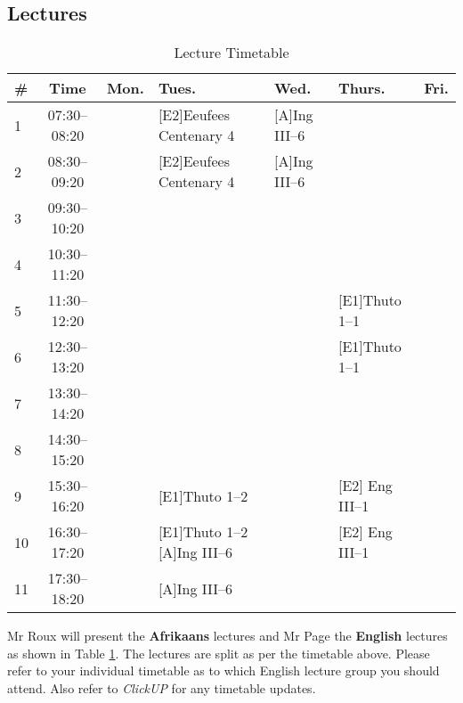     \subsection{Lectures}
        \begin{table}[!h]
            \begin{center}
             \begin{tabular}{|l|c|p{1.4cm}|p{2.6cm}|p{2.1cm}|p{2.6cm}|p{1.4cm}|}
                 \hline
                 {\bf \#} & {\bf Time} & {\bf Mon.} & {\bf Tues.} & {\bf Wed.} &
                 {\bf Thurs.} & {\bf Fri.} \\
                 \hline
                 1  & 07:30--08:20 &  & [E2]Eeufees Centenary 4 & [A]Ing III--6 &  & \\ \hline
                 2  & 08:30--09:20 &  & [E2]Eeufees Centenary 4 & [A]Ing III--6 &  & \\ \hline
                 3  & 09:30--10:20 &  &  &  &  & \\ \hline
                 4  & 10:30--11:20 &  &  &  &  & \\ \hline
                 5  & 11:30--12:20 &  &  &  & [E1]Thuto 1--1 & \\ \hline
                 6  & 12:30--13:20 &  &  &  & [E1]Thuto 1--1 & \\ \hline
                 7  & 13:30--14:20 &  &  &  &  & \\ \hline
                 8  & 14:30--15:20 &  &  &  &  & \\ \hline
                 9  & 15:30--16:20 &  & [E1]Thuto 1--2 &  & [E2] Eng III--1 & \\ \hline
                 10 & 16:30--17:20 &  & [E1]Thuto 1--2 [A]Ing III--6 &  & [E2] Eng III--1 & \\ \hline
                 11 & 17:30--18:20 &  & [A]Ing III--6 &  &  & \\
                 \hline
             \end{tabular}
             \caption{Lecture Timetable}
            \label{tab:lectures}
            \end{center}
        \end{table}

        Mr Roux will present the \textbf{Afrikaans} lectures and Mr Page the
        \textbf{English} lectures as shown in Table \ref{tab:lectures}. The
        lectures are split as per the timetable above. Please refer to your
        individual timetable as to which English lecture group you should
        attend. Also refer to {\it ClickUP} for any timetable updates.

